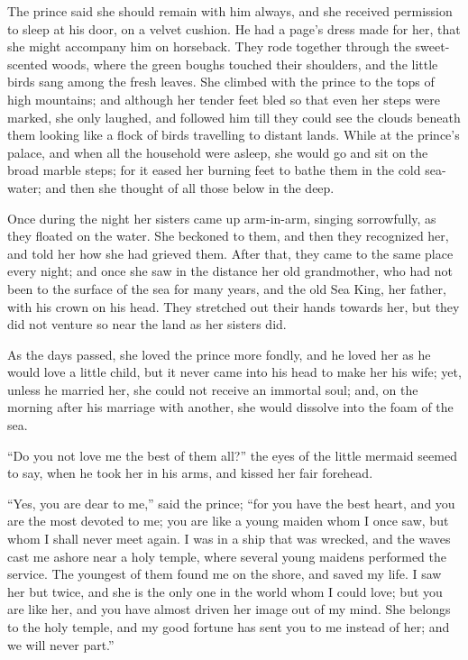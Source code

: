 The prince said she should remain with him always, and she received permission to sleep at his door, on a velvet cushion.
He had a page’s dress made for her, that she might accompany him on horseback.
They rode together through the sweet-scented woods, where the green boughs touched their shoulders, and the little birds sang among the fresh leaves.
She climbed with the prince to the tops of high mountains; and although her tender feet bled so that even her steps were marked, she only laughed, and followed him till they could see the clouds beneath them looking like a flock of birds travelling to distant lands.
While at the prince’s palace, and when all the household were asleep, she would go and sit on the broad marble steps; for it eased her burning feet to bathe them in the cold sea-water; and then she thought of all those below in the deep.

Once during the night her sisters came up arm-in-arm, singing sorrowfully, as they floated on the water.
She beckoned to them, and then they recognized her, and told her how she had grieved them.
After that, they came to the same place every night; and once she saw in the distance her old grandmother, who had not been to the surface of the sea for many years, and the old Sea King, her father, with his crown on his head.
They stretched out their hands towards her, but they did not venture so near the land as her sisters did.

As the days passed, she loved the prince more fondly, and he loved her as he would love a little child, but it never came into his head to make her his wife; yet, unless he married her, she could not receive an immortal soul; and, on the morning after his marriage with another, she would dissolve into the foam of the sea.

``Do you not love me the best of them all?'' the eyes of the little mermaid seemed to say, when he took her in his arms, and kissed her fair forehead.

``Yes, you are dear to me,'' said the prince; ``for you have the best heart, and you are the most devoted to me; you are like a young maiden whom I once saw, but whom I shall never meet again.
I was in a ship that was wrecked, and the waves cast me ashore near a holy temple, where several young maidens performed the service.
The youngest of them found me on the shore, and saved my life.
I saw her but twice, and she is the only one in the world whom I could love; but you are like her, and you have almost driven her image out of my mind.
She belongs to the holy temple, and my good fortune has sent you to me instead of her; and we will never part.''

